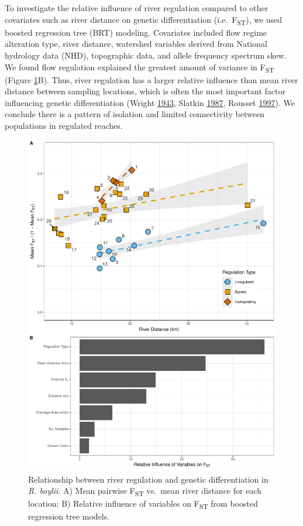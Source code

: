 \documentclass[proquest,12pt,final]{ucthesis-CA2012} %
\begin{document}
\begin{ucmainmatter}
To investigate the relative influence of river regulation compared to
other covariates such as river distance on genetic differentiation
(i.e.~F\textsubscript{ST}), we used boosted regression tree (BRT)
modeling. Covariates included flow regime alteration type, river
distance, watershed variables derived from National hydrology data
(NHD), topographic data, and allele frequency spectrum skew. We found
flow regulation explained the greatest amount of variance in
F\textsubscript{ST} (Figure \ref{fig:CH1F3fst}B). Thus, river regulation
has a larger relative influence than mean river distance between
sampling locations, which is often the most important factor influencing
genetic differentiation (Wright
\protect\hyperlink{ref-wright_isolation_1943}{1943}, Slatkin
\protect\hyperlink{ref-slatkin_gene_1987}{1987}, Rousset
\protect\hyperlink{ref-rousset_genetic_1997}{1997}). We conclude there
is a pattern of isolation and limited connectivity between populations
in regulated reaches.






\begin{figure}
\includegraphics[width=0.9\linewidth]{figure/ch1/fig_03ab_fst_brt_cowplot_for_phd} \caption{Relationship between river regulation and genetic
differentiation in \emph{R. boylii}. A) Mean pairwise
F\textsubscript{ST} vs.~mean river distance for each location; B)
Relative influence of variables on F\textsubscript{ST} from boosted
regression tree models.}\label{fig:CH1F3fst}
\end{figure}
\clearpage


\end{ucmainmatter}
\end{document}
